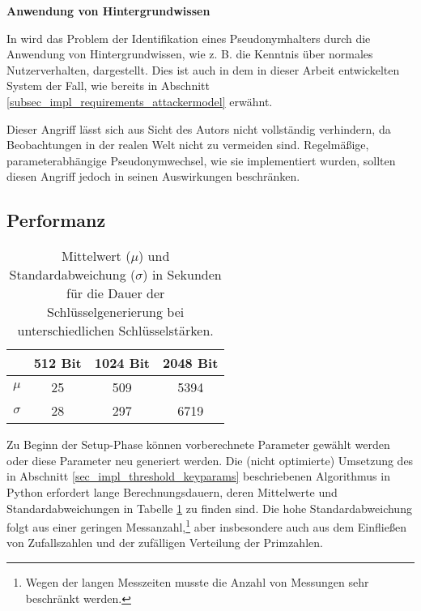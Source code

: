 
\textbf{Anwendung von Hintergrundwissen}

In \cite{lundin1999privacy} wird das Problem der Identifikation eines Pseudonymhalters durch die Anwendung von Hintergrundwissen, wie z. B. die Kenntnis über normales Nutzerverhalten, dargestellt. Dies ist auch in dem in dieser Arbeit entwickelten System der Fall, wie bereits in Abschnitt \ref{subsec_impl_requirements_attackermodel} erwähnt. 

Dieser Angriff lässt sich aus Sicht des Autors nicht vollständig verhindern, da Beobachtungen in der realen Welt nicht zu vermeiden sind. Regelmäßige, parameterabhängige Pseudonymwechsel, wie sie implementiert wurden, sollten diesen Angriff jedoch in seinen Auswirkungen beschränken.



\subsection{Performanz}

\begin{table}
  \centering
  \begin{tabular}{|c|c|c|c|}
  \hline 
   & \textbf{512 Bit} & \textbf{1024 Bit} & \textbf{2048 Bit }\\ 
  \hline 
  \(\mu\) & 25  & 509 & 5394 \\ 
  \hline 
  \(\sigma\) & 28  & 297 & 6719 \\ 
  \hline 
  \end{tabular} 
  \caption{Mittelwert (\(\mu\)) und Standardabweichung (\(\sigma\)) in Sekunden für die Dauer der Schlüsselgenerierung bei unterschiedlichen Schlüsselstärken.}
  \label{tab_key_generation}
\end{table}

Zu Beginn der Setup-Phase können vorberechnete Parameter gewählt werden oder diese Parameter neu generiert werden. Die (nicht optimierte) Umsetzung des in Abschnitt \ref{sec_impl_threshold_keyparams} beschriebenen Algorithmus in Python erfordert lange Berechnungsdauern, deren Mittelwerte und Standardabweichungen in Tabelle \ref{tab_key_generation} zu finden sind. Die hohe Standardabweichung folgt aus einer geringen Messanzahl,\footnote{
  Wegen der langen Messzeiten musste die Anzahl von Messungen sehr beschränkt werden.
} aber insbesondere auch aus dem Einfließen von Zufallszahlen und der zufälligen Verteilung der Primzahlen. 

